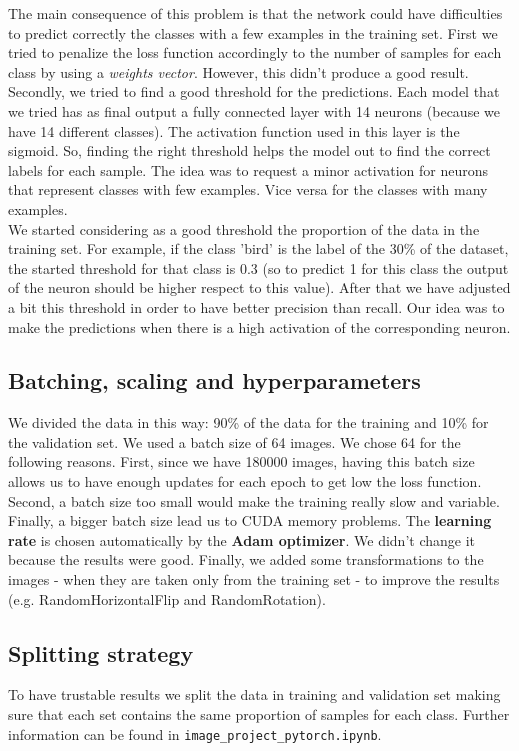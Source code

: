 The main consequence of this problem is that the network could have difficulties to predict correctly the classes with a few examples in the training set. 
First we tried to penalize the loss function accordingly to the number of samples for each class by using a \textit{weights vector}. However, this didn't produce a good result.
Secondly, we tried to find a good threshold for the predictions. Each model that we tried has as final output a fully connected layer with 14 neurons (because we have 14 different classes). The activation function used in this layer is the sigmoid. So, finding the right threshold helps the model out to find the correct labels for each sample. The idea was to request a minor activation for neurons that represent classes with few examples. Vice versa for the classes with many examples. \\
We started considering as a good threshold the proportion of the data in the training set. For example, if the class 'bird' is the label of the 30\% of the dataset, the started threshold for that class is 0.3 (so to predict 1 for this class the output of the neuron should be higher respect to this value). After that we have adjusted a bit this threshold in order to have better precision than recall. Our idea was to make the predictions when there is a high activation of the corresponding neuron.

\subsection{Batching, scaling and hyperparameters}

We divided the data in this way: 90\% of the data for the training and 10\% for the validation set. We used a batch size of 64 images. We chose 64 for the following reasons. First, since we have 180000 images, having this batch size allows us to have enough updates for each epoch to get low the loss function. Second, a batch size too small would make the training really slow and variable. Finally, a bigger batch size lead us to CUDA memory problems.
The \textbf{learning rate} is chosen automatically by the \textbf{Adam optimizer}. We didn't change it because the results were good.
Finally, we added some transformations to the images - when they are taken only from the training set - to improve the results (e.g. RandomHorizontalFlip and RandomRotation).

\subsection{Splitting strategy}

To have trustable results we split the data in training and validation set making sure that each set contains the same proportion of samples for each class. Further information can be found in \texttt{image\_project\_pytorch.ipynb}.